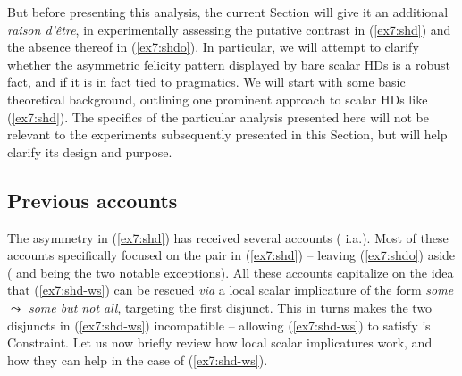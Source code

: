 But before presenting this analysis, the current Section will give it an additional \textit{raison d'être}, in experimentally assessing the putative contrast in (\ref{ex7:shd}) and the absence thereof in (\ref{ex7:shdo}). In particular, we will attempt to clarify whether the asymmetric felicity pattern displayed by bare scalar HDs is a robust fact, and if it is in fact tied to pragmatics. We will start with some basic theoretical background, outlining one prominent approach to scalar HDs like (\ref{ex7:shd}). The specifics of the particular analysis presented here will not be relevant to the experiments subsequently presented in this Section, but will help clarify its design and purpose.

\subsection{Previous accounts}

The asymmetry in (\ref{ex7:shd}) has received several accounts (\cite{Singh2008a,Fox2018,Tomioka2021,Ippolito2019,HenotMortier2023} i.a.). Most of these accounts specifically focused on the pair in (\ref{ex7:shd}) -- leaving (\ref{ex7:shdo}) aside ( and  being the two notable exceptions). All these accounts capitalize on the idea that (\ref{ex7:shd-ws}) can be rescued \textit{via} a local scalar implicature of the form \textit{some $\leadsto$ \textit{some but not all}}, targeting the first disjunct. This in turns makes the two disjuncts in (\ref{ex7:shd-ws}) incompatible -- allowing (\ref{ex7:shd-ws}) to satisfy \citeauthor{Hurford1974}'s Constraint. Let us now briefly review how local scalar implicatures work, and how they can help in the case of  (\ref{ex7:shd-ws}).\\

